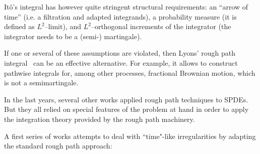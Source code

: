 \documentclass[11pt,a4paper]{article}
\newcommand{\mathd}{\mathrm{d}}
\theoremstyle{remark}
\begin{document}
It\^{o}'s integral has however quite stringent structural requirements: an ``arrow of time'' (i.e. a filtration and adapted integrands), a probability measure (it is defined as $L^2$--limit), and $L^2$--orthogonal increments of the integrator (the integrator needs to be a (semi-) martingale).

If one or several of these assumptions are violated, then Lyons' rough path integral~\cite{Lyons1998, Lyons2002, Lyons2007, Friz2010} can be an effective alternative. For example, it allows to construct pathwise  integrals for, among other processes, fractional Brownian motion, which is not a semimartingale. 




In the last years, several other works applied rough path techniques to SPDEs. 
But they all relied on special features of the problem at hand in order to apply the integration theory provided by the rough path machinery. 

A first series of works attempts to deal with ``time"-like irregularities by adapting the standard rough path approach:
\end{document}
